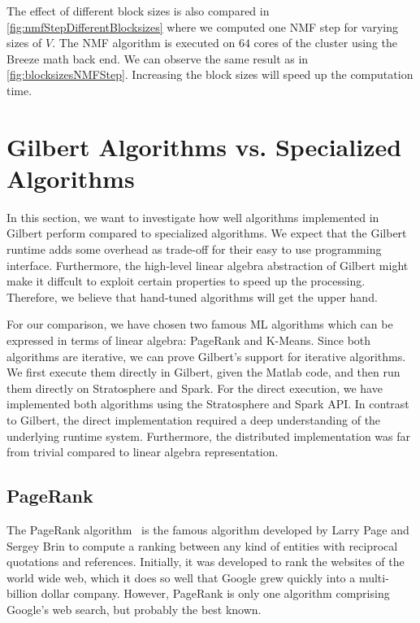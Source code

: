 The effect of different block sizes is also compared in \cref{fig:nmfStepDifferentBlocksizes} where we computed one NMF step for varying sizes of $V$.
The NMF algorithm is executed on $64$ cores of the cluster using the Breeze math back end.
We can observe the same result as in \cref{fig:blocksizesNMFStep}.
Increasing the block sizes will speed up the computation time. 

\section{Gilbert Algorithms vs. Specialized Algorithms}

In this section, we want to investigate how well algorithms implemented in Gilbert perform compared to specialized algorithms.
We expect that the Gilbert runtime adds some overhead as trade-off for their easy to use programming interface.
Furthermore, the high-level linear algebra abstraction of Gilbert might make it diffcult to exploit certain properties to speed up the processing.
Therefore, we believe that hand-tuned algorithms will get the upper hand.

For our comparison, we have chosen two famous ML algorithms which can be expressed in terms of linear algebra: PageRank and K-Means.
Since both algorithms are iterative, we can prove Gilbert's support for iterative algorithms.
We first execute them directly in Gilbert, given the Matlab code, and then run them directly on Stratosphere and Spark.
For the direct execution, we have implemented both algorithms using the Stratosphere and Spark API.
In contrast to Gilbert, the direct implementation required a deep understanding of the underlying runtime system.
Furthermore, the distributed implementation was far from trivial compared to linear algebra representation.

\subsection{PageRank}

The PageRank algorithm~\cite{page:1999a} is the famous algorithm developed by Larry Page and Sergey Brin to compute a ranking between any kind of entities with reciprocal quotations and references.
Initially, it was developed to rank the websites of the world wide web, which it does so well that Google grew quickly into a multi-billion dollar company.
However, PageRank is only one algorithm comprising Google's web search, but probably the best known.

